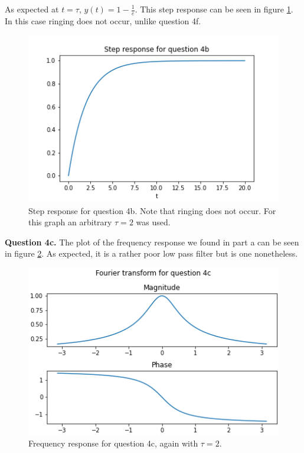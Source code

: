 \documentclass[letterpaper, reqno,11pt]{article}
\begin{document}
As expected at $t=\tau$, $y(t)=1-\frac1e$. This step response can be seen in figure \ref{fig:q4b}. In this case ringing does not occur, unlike question 4f. 

\begin{figure}[htbp]
\centering
\includegraphics[width=\textwidth]{q4b}
\caption{Step response for question 4b. Note that ringing does not occur. For this graph an arbitrary $\tau=2$ was used. }
\label{fig:q4b}
\end{figure}

{\noindent\bf Question 4c.} The plot of the frequency response we found in part a can be seen in figure \ref{fig:q4c}. As expected, it is a rather poor low pass filter but is one nonetheless. 

\begin{figure}[htbp]
\centering
\includegraphics[width=\textwidth]{q4c}
\caption{Frequency response for question 4c, again with $\tau=2$. }
\label{fig:q4c}
\end{figure}
\end{document}
